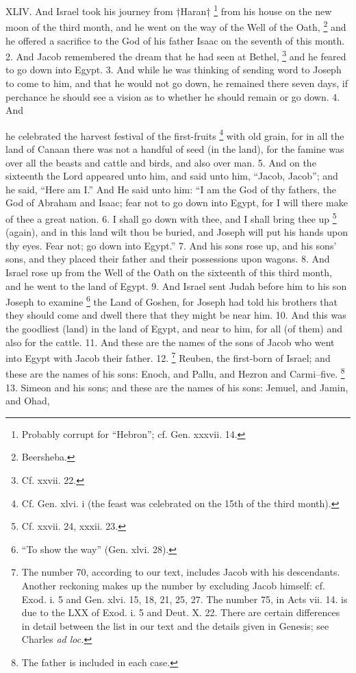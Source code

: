 
XLIV. And Israel took his journey from †Haran† \footnote{Probably corrupt for ``Hebron''; cf. Gen. xxxvii. 14.} from his house on the new moon of the third month, and he went on the way of the Well of the Oath, \footnote{Beersheba.} and he offered a sacrifice to the God of his father Isaac on the seventh of this month. 2. And Jacob remembered the dream that he had seen at Bethel, \footnote{Cf. xxvii. 22.} and he feared to go down into Egypt. 3. And while he was thinking of sending word to Joseph to come to him, and that he would not go down, he remained there seven days, if perchance he should see a vision as to whether he should remain or go down. 4. And

he celebrated the harvest festival of the first-fruits \footnote{Cf. Gen. xlvi. i (the feast was celebrated on the 15th of the third month).} with old grain, for in all the land of Canaan there was not a handful of seed (in the land), for the famine was over all the beasts and cattle and birds, and also over man. 5. And on the sixteenth the Lord appeared unto him, and said unto him, ``Jacob, Jacob''; and he said, ``Here am I.'' And He said unto him: ``I am the God of thy fathers, the God of Abraham and Isaac; fear not to go down into Egypt, for I will there make of thee a great nation. 6. I shall go down with thee, and I shall bring thee up \footnote{Cf. xxvii. 24, xxxii. 23.} (again), and in this land wilt thou be buried, and Joseph will put his hands upon thy eyes. Fear not; go down into Egypt.'' 7. And his sons rose up, and his sons' sons, and they placed their father and their possessions upon wagons. 8. And Israel rose up from the Well of the Oath on the sixteenth of this third month, and he went to the land of Egypt. 9. And Israel sent Judah before him to his son Joseph to examine \footnote{``To show the way'' (Gen. xlvi. 28).} the Land of Goshen, for Joseph had told his brothers that they should come and dwell there that they might be near him. 10. And this was the goodliest (land) in the land of Egypt, and near to him, for all (of them) and also for the cattle. 11. And these are the names of the sons of Jacob who went into Egypt with Jacob their father. 12. \footnote{The number 70, according to our text, includes Jacob with his descendants. Another reckoning makes up the number by excluding Jacob himself: cf. Exod. i. 5 and Gen. xlvi. 15, 18, 21, 25, 27. The number 75, in Acts vii. 14. is due to the LXX of Exod. i. 5 and Deut. X. 22. There are certain differences in detail between the list in our text and the details given in Genesis; see Charles \emph{ad loc.}} Reuben, the first-born of Israel; and these are the names of his sons: Enoch, and Pallu, and Hezron and Carmi--five. \footnote{The father is included in each case.} 13. Simeon and his sons; and these are the names of his sons: Jemuel, and Jamin, and Ohad,


